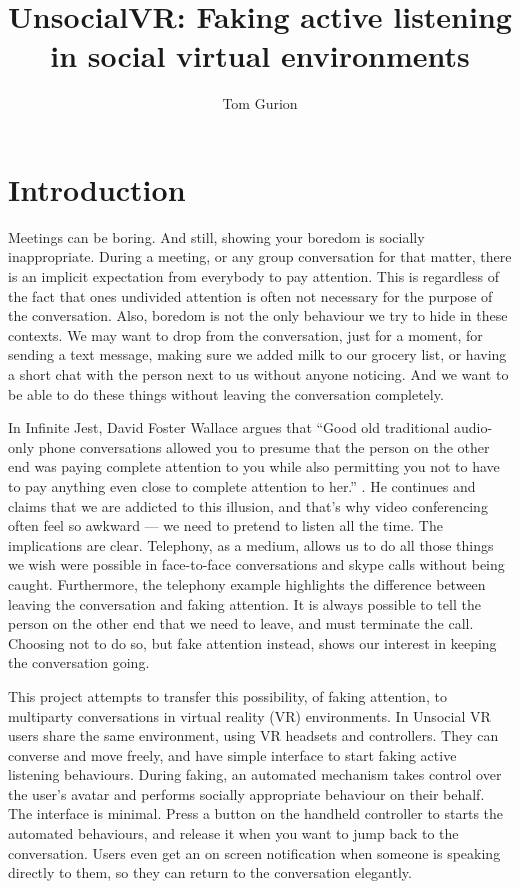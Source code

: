\documentclass[]{simple-thesis}
\title{UnsocialVR: Faking active listening in social virtual environments}
\author{Tom Gurion}
\affiliation{Media and Arts Technology\\Queen Mary University of London}
\begin{document}
\frontmatter{}  %


\setcounter{page}{1}  %
\chapter{Introduction}

Meetings can be boring.
And still, showing your boredom is socially inappropriate.
During a meeting, or any group conversation for that matter, there is an implicit expectation from everybody to pay attention.
This is regardless of the fact that ones undivided attention is often not necessary for the purpose of the conversation.
Also, boredom is not the only behaviour we try to hide in these contexts.
We may want to drop from the conversation, just for a moment, for sending a text message, making sure we added milk to our grocery list, or having a short chat with the person next to us without anyone noticing.
And we want to be able to do these things without leaving the conversation completely.

In Infinite Jest, David Foster Wallace argues that ``Good old traditional audio-only phone conversations allowed you to presume that the person on the other end was paying complete attention to you while also permitting you not to have to pay anything even close to complete attention to her.'' \citep{Wallace1996}.
He continues and claims that we are addicted to this illusion, and that's why video conferencing often feel so awkward --- we need to pretend to listen all the time.
The implications are clear.
Telephony, as a medium, allows us to do all those things we wish were possible in face-to-face conversations and skype calls without being caught.
Furthermore, the telephony example highlights the difference between leaving the conversation and faking attention.
It is always possible to tell the person on the other end that we need to leave, and must terminate the call.
Choosing not to do so, but fake attention instead, shows our interest in keeping the conversation going.

This project attempts to transfer this possibility, of faking attention, to multiparty conversations in virtual reality (VR) environments.
In Unsocial VR users share the same environment, using VR headsets and controllers.
They can converse and move freely, and have simple interface to start faking active listening behaviours.
During faking, an automated mechanism takes control over the user's avatar and performs socially appropriate behaviour on their behalf.
The interface is minimal.
Press a button on the handheld controller to starts the automated behaviours, and release it when you want to jump back to the conversation.
Users even get an on screen notification when someone is speaking directly to them, so they can return to the conversation elegantly.
\end{document}
